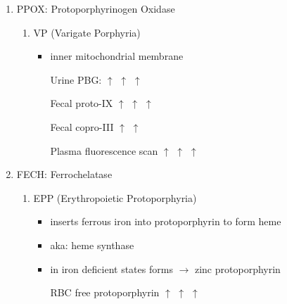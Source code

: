 \documentclass{scrartcl}
\begin{document}
\begin{enumerate}
\item PPOX: Protoporphyrinogen Oxidase
\label{sec:org299a6fc}
\begin{enumerate}
\item VP (Varigate Porphyria)
\label{sec:orga9c86e7}
\begin{itemize}
\item inner mitochondrial membrane
\item[{Urine PBG:}] \(\uparrow\) \(\uparrow\) \(\uparrow\)
\item[{Fecal proto-IX}] \(\uparrow\) \(\uparrow\) \(\uparrow\)
\item[{Fecal copro-III}] \(\uparrow\) \(\uparrow\)
\item[{Plasma fluorescence scan}] \(\uparrow\) \(\uparrow\) \(\uparrow\)
\end{itemize}
\end{enumerate}

\item FECH: Ferrochelatase
\label{sec:org2c2d3a5}
\begin{enumerate}
\item EPP (Erythropoietic Protoporphyria)
\label{sec:org017af97}
\begin{itemize}
\item inserts ferrous iron into protoporphyrin to form heme
\item aka: heme synthase
\item in iron deficient states forms \(\to\) zinc protoporphyrin
\item[{RBC free protoporphyrin}] \(\uparrow\) \(\uparrow\) \(\uparrow\)
\end{itemize}
\end{enumerate}
\end{enumerate}
\end{document}
